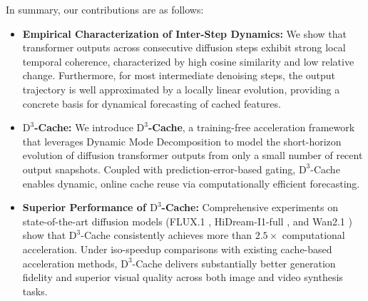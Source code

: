 \quad In summary,
our contributions are as follows:
\begin{itemize}[leftmargin=*,itemsep=2pt, topsep=0pt, parsep=0pt]
\item \textbf{Empirical Characterization of Inter-Step Dynamics:}
We show that transformer outputs across consecutive diffusion steps
exhibit strong local temporal coherence,
characterized by high cosine similarity and low relative change.
Furthermore, for most intermediate denoising steps,
the output trajectory is well approximated by a locally linear evolution,
providing a concrete basis for dynamical forecasting of cached features.

\item \textbf{$\mathrm{D}^3$-Cache:}
We introduce \textbf{$\mathrm{D}^3$-Cache},
a training-free acceleration framework
that leverages Dynamic Mode Decomposition
to model the short-horizon evolution
of diffusion transformer outputs
from only a small number of recent output snapshots.
Coupled with prediction-error-based gating,
$\mathrm{D}^3$-Cache enables dynamic, online cache reuse
via computationally efficient forecasting.


\item \textbf{Superior Performance of $\mathrm{D}^3$-Cache:}
Comprehensive experiments on state-of-the-art diffusion models
(FLUX.1 \cite{flux2024}, HiDream-I1-full \cite{hidreami1technicalreport}, and Wan2.1 \cite{wan2025})
show that $\mathrm{D}^3$-Cache consistently achieves more than $2.5\times$
computational acceleration.
Under iso-speedup comparisons with existing cache-based acceleration methods,
$\mathrm{D}^3$-Cache delivers substantially better generation fidelity
and superior visual quality across both image and video synthesis tasks.
\end{itemize}
